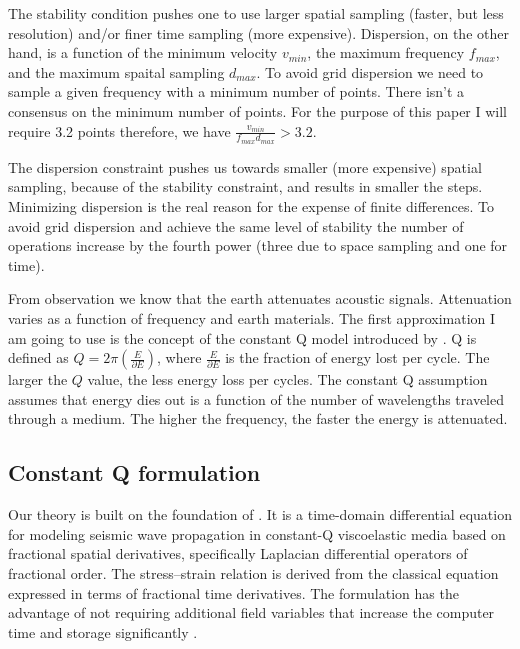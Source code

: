 \documentclass{paris17}
\begin{document}
The stability condition pushes one to use larger spatial sampling (faster, but less resolution) and/or finer time sampling (more expensive).  Dispersion, on the other hand, is a function of the minimum velocity $v_{min}$, the maximum frequency $f_{max}$, and the maximum spaital sampling $d_{max}$.   To avoid grid dispersion we need to  sample a given frequency with a minimum number of points.  There isn't a consensus on the minimum number
of points. For the purpose of this paper I will require  3.2  points therefore, we have $\frac{v_{min} }{f_{max}d_{max}} > 3.2 \label{eq:dispersion}$.

The dispersion constraint pushes us towards smaller (more expensive) spatial sampling, because of the stability constraint, and results in smaller the steps.  Minimizing dispersion is the real reason for the expense of finite differences.  To avoid grid dispersion and achieve the same level of stability the number of operations increase by the fourth power (three due to space sampling and one for time).

From observation we know that the earth attenuates acoustic signals.  Attenuation varies as a function of frequency and earth materials. The first approximation I am going to use is the concept of the constant Q model introduced by \cite{Kjartansson.sep.23}.  Q is defined as $Q=2 \pi \left( \frac{E}{\partial E}\right)$, where $\frac{E}{\partial E}$ is the fraction of energy lost per cycle. The larger the $Q$ value, the less energy loss per cycles.  The constant Q assumption assumes that energy dies out is a function of the number of wavelengths traveled through a medium. The higher the frequency, the faster the energy is attenuated.

\subsection{Constant Q formulation}

Our theory is built on the foundation of \cite[]{zhu2014theory}. It is a time-domain differential equation for modeling seismic wave propagation in constant-Q viscoelastic media based on fractional spatial derivatives, specifically Laplacian differential operators of fractional order.  The stress–strain relation is derived from the classical equation expressed in terms of fractional time derivatives. The formulation has the advantage of not requiring additional field variables that increase the computer time and storage significantly \cite[]{zhu2014theory}.
\end{document}
